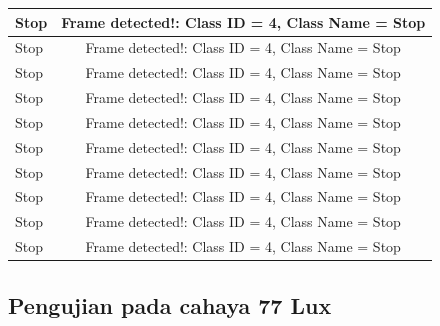 \begin{longtable}{|l|c|}
  Stop           & Frame detected!: Class ID = 4, Class Name = Stop \\ \hline
  Stop           & Frame detected!: Class ID = 4, Class Name = Stop \\ \hline
  Stop           & Frame detected!: Class ID = 4, Class Name = Stop \\ \hline
  Stop           & Frame detected!: Class ID = 4, Class Name = Stop \\ \hline
  Stop           & Frame detected!: Class ID = 4, Class Name = Stop \\ \hline
  Stop           & Frame detected!: Class ID = 4, Class Name = Stop \\ \hline
  Stop           & Frame detected!: Class ID = 4, Class Name = Stop \\ \hline
  Stop           & Frame detected!: Class ID = 4, Class Name = Stop \\ \hline
  Stop           & Frame detected!: Class ID = 4, Class Name = Stop \\ \hline
  Stop           & Frame detected!: Class ID = 4, Class Name = Stop \\ \hline
\end{longtable}

\subsection{Pengujian pada cahaya 77 Lux}

